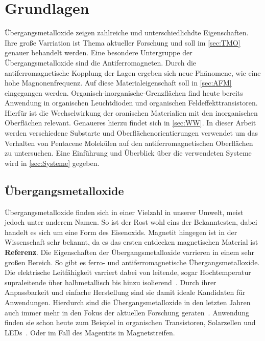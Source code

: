 \chapter{Grundlagen}
    Übergangsmetalloxide zeigen zahlreiche und unterschiedlichdte Eigenschaften.
    Ihre große Varriation ist Thema aktueller Forschung und soll im \autoref{sec:TMO} genauer behandelt werden.
    Eine besondere Untergruppe der Übergangsmetalloxide sind die Antiferromagneten.
    Durch die antiferromagnetische Kopplung der Lagen ergeben sich neue Phänomene, wie eine hohe Magnonenfrequenz.
    Auf diese Materialeigenschaft soll in \autoref{sec:AFM} eingegangen werden.
    Organisch-inorganische-Grenzflächen find heute bereits Anwendung in organischen Leuchtdioden und organischen Feldeffekttransistoren.
    Hierfür ist die Wechselwirkung der oranischen Materialien mit den inorganischen Oberflächen relevant.
    Genaueres hierzu findet sich in \autoref{sec:WW}.
    In dieser Arbeit werden verschiedene Substarte und Oberflächenorientierungen verwendet um das Verhalten von Pentacene Molekülen auf den antiferromagnetischen Oberflächen zu untersuchen.
    Eine Einführung und Überblick über die verwendeten Systeme wird in \autoref{sec:Systeme} gegeben.
    

    \section{Übergangsmetalloxide} \label{sec:TMO}
        Übergangsmetalloxide finden sich in einer Vielzahl in unserer Umwelt, meist jedoch unter anderem Namen.
        So ist der Rost wohl eins der Bekanntesten, dabei handelt es sich um eine Form des Eisenoxids.
        Magnetit hingegen ist in der Wissenschaft sehr bekannt, da es das ersten entdecken magnetischen Material ist \textbf{Referenz}.
        Die Eigenschaften der Übergangsmetalloxide varrieren in einem sehr großen Bereich.
        So gibt es ferro- und antiferromagnetische Übergangsmetalloxide.
        Die elektrische Leitfähigkeit varriert dabei von leitende, sogar Hochtemperatur supraleitende über halbmetallisch bis hinzu isolierend~\cite{IF_5}.
        Durch ihrer Anpassbarkeit und einfache Herstellung sind sie damit ideale Kandidaten für Anwendungen.
        Hierdurch sind die Übergangsmetalloxide in den letzten Jahren auch immer mehr in den Fokus der aktuellen Forschung geraten~\cite{IF_6, parkinson_iron_2016, cornell_iron_2003}.
        Anwendung finden sie schon heute zum Beispiel in organischen Transistoren, Solarzellen und LEDs~\cite{IF_3}.
        Oder im Fall des Magentits in Magnetstreifen.

